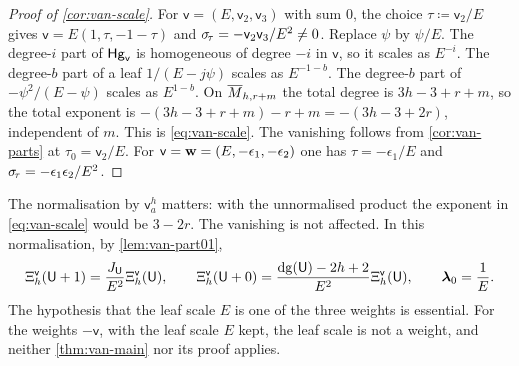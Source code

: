 \begin{proof}[Proof of \cref{cor:van-scale}]
For $\mathsf{v}=(E,\mathsf{v}_2,\mathsf{v}_3)$ with sum $0$, the choice $\tau\coloneqq\mathsf{v}_2/E$ gives $\mathsf{v}=E(1,\tau,-1-\tau)$ and $\sigma_{\!\tau}=-\mathsf{v}_2\mathsf{v}_3/E^2\neq 0$. Replace $\psi$ by $\psi/E$. The degree-$i$ part of $\mathsf{Hg}_{\mathsf{v}}$ is homogeneous of degree $-i$ in $\mathsf{v}$, so it scales as $E^{-i}$. The degree-$b$ part of a leaf $1/(E-j\psi)$ scales as $E^{-1-b}$. The degree-$b$ part of $-\psi^2/(E-\psi)$ scales as $E^{1-b}$. On $\overline{M}_{h,r+m}$ the total degree is $3h-3+r+m$, so the total exponent is $-(3h-3+r+m)-r+m=-(3h-3+2r)$, independent of $m$. This is \eqref{eq:van-scale}. The vanishing follows from \cref{cor:van-parts} at $\tau_0=\mathsf{v}_2/E$. For $\mathsf{v}=\mathbf{w}=(E,-\epsilon_1,-\epsilon_2)$ one has $\tau=-\epsilon_1/E$ and $\sigma_{\!\tau}=-\epsilon_1\epsilon_2/E^2$.
\end{proof}

\begin{rmk}\label{rmk:van-scale}
The normalisation by $\mathsf{v}_a^h$ matters: with the unnormalised product the exponent in \eqref{eq:van-scale} would be $3-2r$. The vanishing is not affected. In this normalisation, by \cref{lem:van-part01},
\[
\Xi^{\mathsf{v}}_h(\mathsf{U}+1)=\frac{J_{\mathsf{U}}}{E^2}\Xi^{\mathsf{v}}_h(\mathsf{U}),\qquad\Xi^{\mathsf{v}}_h(\mathsf{U}+0)=\frac{\mathrm{dg}(\mathsf{U})-2h+2}{E^2}\Xi^{\mathsf{v}}_h(\mathsf{U}),\qquad\boldsymbol{\lambda}_0=\frac1E.
\]
The hypothesis that the leaf scale $E$ is one of the three weights is essential. For the weights $-\mathsf{v}$, with the leaf scale $E$ kept, the leaf scale is not a weight, and neither \cref{thm:van-main} nor its proof applies.
\end{rmk}
